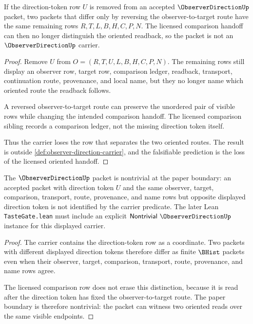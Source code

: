 \begin{theorem}
\label{thm:observer-direction-falsifiable-boundary}
If the direction-token row $U$ is removed from an accepted $\ObserverDirectionUp$ packet, two packets that differ only by reversing the observer-to-target route have the same remaining rows $R,T,L,B,H,C,P,N$. The licensed comparison handoff can then no longer distinguish the oriented readback, so the packet is not an $\ObserverDirectionUp$ carrier.
\end{theorem}
\begin{proof}
Remove $U$ from $O=(R,T,U,L,B,H,C,P,N)$. The remaining rows still display an observer row, target row, comparison ledger, readback, transport, continuation route, provenance, and local name, but they no longer name which oriented route the readback follows.

A reversed observer-to-target route can preserve the unordered pair of visible rows while changing the intended comparison handoff. The licensed comparison sibling records a comparison ledger, not the missing direction token itself.

Thus the carrier loses the row that separates the two oriented routes. The result is outside \autoref{def:observer-direction-carrier}, and the falsifiable prediction is the loss of the licensed oriented handoff.
\end{proof}

\begin{theorem}
\label{thm:observer-direction-nontrivial-boundary}
The $\ObserverDirectionUp$ packet is nontrivial at the paper boundary: an accepted packet with direction token $U$ and the same observer, target, comparison, transport, route, provenance, and name rows but opposite displayed direction token is not identified by the carrier predicate. The later Lean \texttt{TasteGate.lean} must include an explicit $\mathsf{Nontrivial}\ \ObserverDirectionUp$ instance for this displayed carrier.
\end{theorem}
\begin{proof}
The carrier contains the direction-token row as a coordinate. Two packets with different displayed direction tokens therefore differ as finite $\BHist$ packets even when their observer, target, comparison, transport, route, provenance, and name rows agree.

The licensed comparison row does not erase this distinction, because it is read after the direction token has fixed the observer-to-target route. The paper boundary is therefore nontrivial: the packet can witness two oriented reads over the same visible endpoints.
\end{proof}

